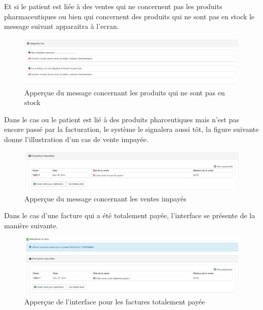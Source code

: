 \documentclass[12pt,a4paper]{report}
\begin{document}
Et si le patient est liée à des ventes qui ne concernent pas les produits pharmaceutiques ou bien qui concernent des produits qui ne sont pas en stock le message suivant apparaitra à l'ecran.

\begin{figure}[h]
\begin{center}
\includegraphics[width=14cm]{pic/NotInStock.png}
\end{center}
\caption{Apperçue du message concernant les produits qui ne sont pas en stock}
\label{Apperçue du message concernant les produits qui ne sont pas en stock}
\end{figure}

Dans le cas ou le patient est lié à des produits pharceutiques mais n'est pas encore passé par la facturation, le système le signalera aussi tôt, la figure suivante donne l'illustration d'un cas de vente impayée.

\begin{figure}[h]
\begin{center}
\includegraphics[width=14cm]{pic/NotPaid.png}
\end{center}
\caption{Apperçue du message concernant les ventes impayés}
\label{Apperçue du message concernant les ventes impayés}
\end{figure}

Dans le cas d'une facture qui a été totalement payée, l'interface se présente de la manière suivante.

\begin{figure}[h]
\begin{center}
\includegraphics[width=14cm]{pic/TotalPaid.png}
\end{center}
\caption{Apperçue de l'interface pour les factures totalement payée}
\label{Apperçue de l'interface pour les factures totalement payée}
\end{figure}
\end{document}
